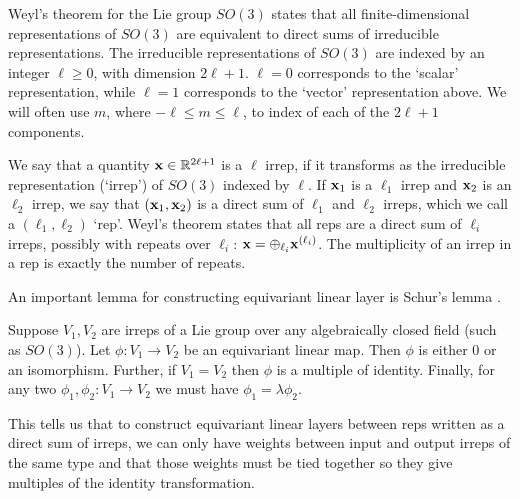 Weyl's theorem for the Lie group $SO(3)$ states that all finite-dimensional representations of $SO(3)$ are equivalent to direct sums of irreducible representations. 
The irreducible representations of $SO(3)$ are indexed by an integer $\ell \geq 0$, with dimension $2\ell + 1$.
$\ell = 0$ corresponds to the `scalar' representation, while $\ell = 1$ corresponds to the `vector' representation above.
We will often use $m$, where $-\ell \leq m \leq \ell$, to index of each of the $2\ell + 1$ components.

We say that a quantity $\mathbf{x} \in \mathbb{R}^{2\ell + 1}$ is a $\ell$ irrep, if it transforms as the irreducible representation (`irrep') of $SO(3)$ indexed by $\ell$.
If $\mathbf{x}_1$ is a $\ell_1$ irrep and $\mathbf{x}_2$ is an $\ell_2$ irrep, we say that $(\mathbf{x}_1, \mathbf{x}_2)$ is a direct sum of $\ell_1$ and $\ell_2$ irreps, which we call a $(\ell_1, \ell_2)$ `rep'. Weyl's theorem states that all reps are a direct sum of $\ell_i$ irreps, possibly with repeats over $\ell_i$:
$
\mathbf{x} = \oplus_{\ell_i} \mathbf{x}^{(\ell_{i})}
$. The multiplicity of an irrep in a rep is exactly the number of repeats.

An important lemma for constructing equivariant linear layer is Schur's lemma \citep{dresselhaus2007group}.
\begin{lemma}
\label{lemma:Schur}
    Suppose $V_1,V_2$ are irreps of a Lie group over any algebraically closed field (such as $SO(3)$). Let $\phi:V_1\to V_2$ be an equivariant linear map. 
    Then $\phi$ is either $0$ or an isomorphism.
    Further, if $V_1=V_2$ then $\phi$ is a multiple of identity.
    Finally, for any two $\phi_1,\phi_2:V_1\to V_2$ we must have $\phi_1=\lambda\phi_2$.
\end{lemma}
This tells us that to construct equivariant linear layers between reps written as a direct sum of irreps, we can only have weights between input and output irreps of the same type and that those weights must be tied together so they give multiples of the identity transformation.
